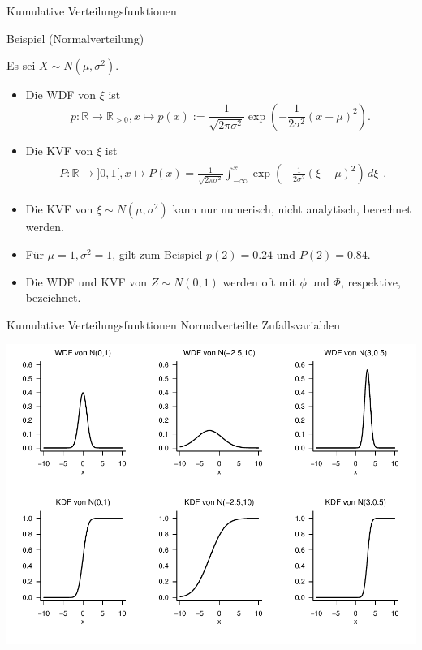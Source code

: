\documentclass[
  8pt,
  ignorenonframetext,
]{beamer}
\begin{document}
\begin{frame}{Kumulative Verteilungsfunktionen}
\protect\hypertarget{kumulative-verteilungsfunktionen-9}{}
\begin{large}
Beispiel (Normalverteilung)
\end{large}

\small
\justifying

Es sei \(X \sim N(\mu,\sigma^2)\). 

\begin{itemize}
\item Die WDF von $\xi$ ist
\begin{equation*}
p : \mathbb{R} \to \mathbb{R}_{>0}, x \mapsto p(x)
:= \frac{1}{\sqrt{2\pi\sigma^2}}\exp\left(-\frac{1}{2\sigma^2}(x-\mu)^2\right).
\end{equation*}
\item Die KVF von $\xi$ ist
\begin{align*}
\begin{split}
P : \mathbb{R} \to ]0,1[, x \mapsto P(x)
 = \frac{1}{\sqrt{2\pi\sigma^2}}\int_{-\infty}^x\exp\left(-\frac{1}{2\sigma^2}(\xi-\mu)^2\right) \,d\xi
\end{split}.
\end{align*}
\item Die KVF von $\xi \sim N(\mu,\sigma^2)$ kann nur numerisch, nicht analytisch, berechnet werden.
\item Für $\mu = 1, \sigma^2 = 1$, gilt zum Beispiel $p(2) = 0.24$ und $P(2) = 0.84$.
\item Die WDF und KVF von $Z \sim N(0,1)$ werden oft mit  $\phi$ und $\Phi$, respektive, bezeichnet.
\end{itemize}
\end{frame}

\begin{frame}{Kumulative Verteilungsfunktionen}
\protect\hypertarget{kumulative-verteilungsfunktionen-10}{}
Normalverteilte Zufallsvariablen \vspace{.2cm}

\begin{center}\includegraphics[width=0.8\linewidth]{4_Abbildungen/wtfi_4_normalverteilung_kvf} \end{center}
\end{frame}
\end{document}
